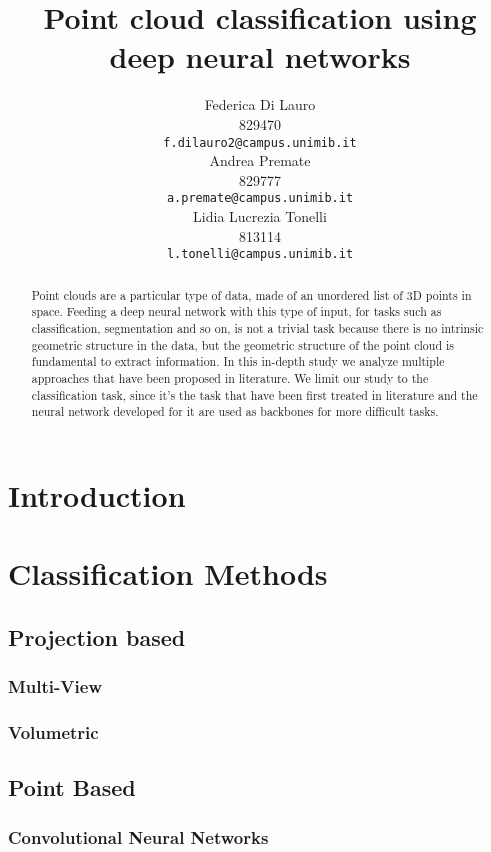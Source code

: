 \documentclass{article}
\title{Point cloud classification using deep neural networks}
\author{
 Federica Di Lauro \\
  829470\\
  \texttt{f.dilauro2@campus.unimib.it} \\
   \And
  Andrea Premate \\
  829777\\
  \texttt{a.premate@campus.unimib.it} \\
  \And
  Lidia Lucrezia Tonelli \\
  813114\\
  \texttt{l.tonelli@campus.unimib.it} \\
}
\begin{document}
\maketitle
\begin{abstract}
Point clouds are a particular type of data, made of an unordered list of 3D points in space. Feeding a deep neural network with this type of input, for tasks such as classification, segmentation and so on, is not a trivial task because there is no intrinsic geometric structure in the data, but the geometric structure of the point cloud is fundamental to extract information. In this in-depth study we analyze multiple approaches that have been proposed in literature. We limit our study to the classification task, since it's the task that have been first treated in literature and the neural network developed for it are used as backbones for more difficult tasks.
\end{abstract}

\section{Introduction}\label{sec:intro}



\section{Classification Methods}

\subsection{Projection based}


\subsubsection{Multi-View}


\subsubsection{Volumetric} 


\subsection{Point Based}


\subsubsection{Convolutional Neural Networks}

\end{document}
